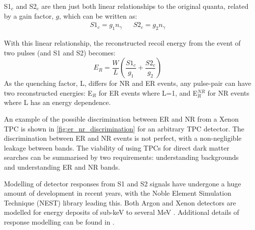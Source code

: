 \par
S1$_c$ and S2$_c$ are then just both linear relationships to the original quanta, related by a gain factor, $g$, which can be written as:
\begin{align}
    S1_c = g_1 n_\gamma && S2_c = g_2 n_\gamma
\end{align}

\par
With this linear relationship, the reconstructed recoil energy from the event of two pulses (and S1 and S2) becomes:
\begin{equation}
    E_R = \frac{W}{L}(\frac{S1_c}{g_1} + \frac{S2_c}{g_2})
\end{equation}
As the quenching factor, L, differs for NR and ER events, any pulse-pair can have two reconstructed energies: E$_R$ for ER events where L=1, and E$_R^{NR}$ for NR events where L has an energy dependence.
\par
An example of the possible discrimination between ER and NR from a Xenon TPC is shown in \autoref{fig:er_nr_discrimination} for an arbitrary TPC detector.
The discrimination between ER and NR events is not perfect, with a non-negligible leakage between bands.
The viability of using TPCs for direct dark matter searches can be summarised by two requirements: understanding backgrounds and understanding ER and NR bands.



\par
Modelling of detector responses from S1 and S2 signals have undergone a huge amount of development in recent years, with the Noble Element Simulation Technique (NEST) library leading this.
Both Argon and Xenon detectors are modelled for energy deposits of sub-keV to several MeV \cite{nest_1_ref}.
Additional details of response modelling can be found in \cite{gregrischbieter_thesis_ref, flamenest_ref}.
